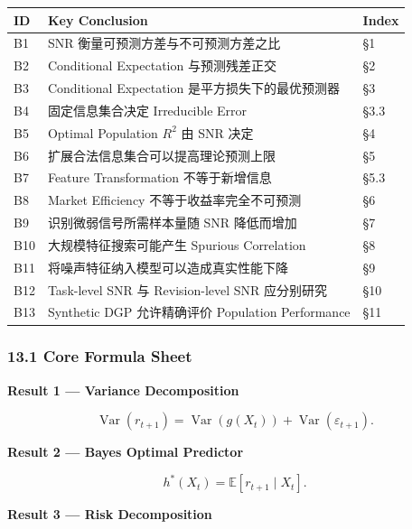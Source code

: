 \begin{readertable}
\begin{longtable}[]{@{}
  >{\raggedright\arraybackslash}p{}
  >{\raggedright\arraybackslash}p{}
  >{\raggedright\arraybackslash}p{}@{}}
\toprule
ID & Key Conclusion & Index \\
\midrule
\endhead
B1 & SNR 衡量可预测方差与不可预测方差之比 & §1 \\
B2 & Conditional Expectation 与预测残差正交 & §2 \\
B3 & Conditional Expectation 是平方损失下的最优预测器 & §3 \\
B4 & 固定信息集合决定 Irreducible Error & §3.3 \\
B5 & Optimal Population \(R^2\) 由 SNR 决定 & §4 \\
B6 & 扩展合法信息集合可以提高理论预测上限 & §5 \\
B7 & Feature Transformation 不等于新增信息 & §5.3 \\
B8 & Market Efficiency 不等于收益率完全不可预测 & §6 \\
B9 & 识别微弱信号所需样本量随 SNR 降低而增加 & §7 \\
B10 & 大规模特征搜索可能产生 Spurious Correlation & §8 \\
B11 & 将噪声特征纳入模型可以造成真实性能下降 & §9 \\
B12 & Task-level SNR 与 Revision-level SNR 应分别研究 & §10 \\
B13 & Synthetic DGP 允许精确评价 Population Performance & §11 \\
\bottomrule
\end{longtable}
\end{readertable}

\hypertarget{part-4-60-0001-core-formula-sheet}{%
\subsubsection{13.1 Core Formula Sheet}\label{part-4-60-0001-core-formula-sheet}}

\textbf{Result 1 --- Variance Decomposition}

\[\operatorname{Var}(r_{t+1})
=
\operatorname{Var}(g(X_t))
+
\operatorname{Var}(\varepsilon_{t+1}).\]

\textbf{Result 2 --- Bayes Optimal Predictor}

\[h^*(X_t)=\mathbb E[r_{t+1}\mid X_t].\]

\textbf{Result 3 --- Risk Decomposition}

